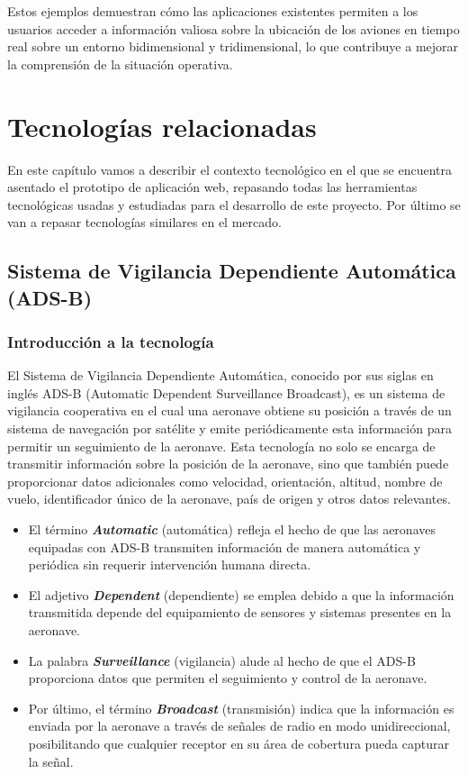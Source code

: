 \documentclass[a4paper, 11pt]{book}
\begin{document}
Estos ejemplos demuestran cómo las aplicaciones existentes permiten a los usuarios acceder a información valiosa sobre la ubicación de los aviones en tiempo real sobre un entorno bidimensional y tridimensional, lo que contribuye a mejorar la comprensión de la situación operativa.

\chapter{Tecnologías relacionadas}
\label{chap:tecnologias}
En este capítulo vamos a describir el contexto tecnológico en el que se encuentra asentado el prototipo de aplicación web, repasando todas las herramientas tecnológicas usadas y estudiadas para el desarrollo de este proyecto.
Por último se van a repasar tecnologías similares en el mercado.
\section{Sistema de Vigilancia Dependiente Automática (ADS-B)}
\label{sec:adsb}
\subsection{Introducción a la tecnología}
El Sistema de Vigilancia Dependiente Automática, conocido por sus siglas en inglés \textsc{ADS-B} (Automatic Dependent Surveillance Broadcast), es un sistema de vigilancia cooperativa en el cual una aeronave obtiene su posición a través de un sistema de navegación por satélite y emite periódicamente esta información para permitir un seguimiento de la aeronave.
Esta tecnología no solo se encarga de transmitir información sobre la posición de la aeronave, sino que también puede proporcionar datos adicionales como velocidad, orientación, altitud, nombre de vuelo, identificador único de la aeronave, país de origen y otros datos relevantes.
\begin{itemize}
	\item El término \textbf{\emph{Automatic}} (automática) refleja el hecho de que las aeronaves equipadas con \textsc{ADS-B} transmiten información de manera automática y periódica sin requerir intervención humana directa.
	\item El adjetivo \textbf{\emph{Dependent}} (dependiente) se emplea debido a que la información transmitida depende del equipamiento de sensores y sistemas presentes en la aeronave.
	\item La palabra \textbf{\emph{Surveillance}} (vigilancia) alude al hecho de que el \textsc{ADS-B} proporciona datos que permiten el seguimiento y control de la aeronave.
	\item Por último, el término\textbf{ \emph{Broadcast}} (transmisión) indica que la información es enviada por la aeronave a través de señales de radio en modo unidireccional, posibilitando que cualquier receptor en su área de cobertura pueda capturar la señal.
\end{itemize}
\end{document}
